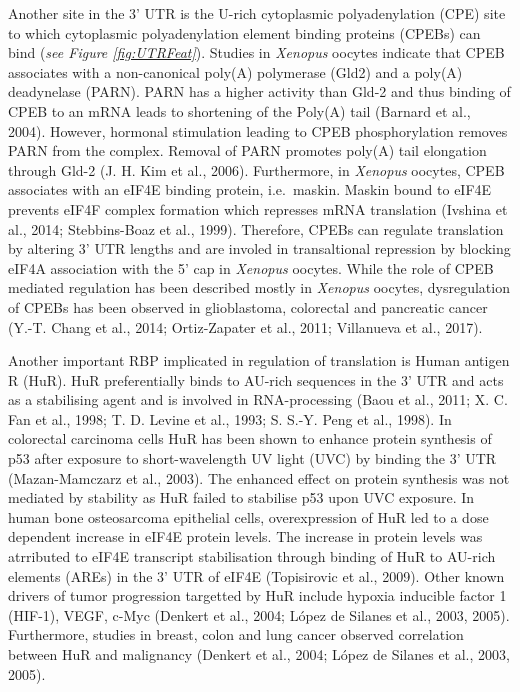 \documentclass[12pt,openany]{book}
\begin{document}
Another site in the 3' UTR is the U-rich cytoplasmic polyadenylation
(CPE) site to which cytoplasmic polyadenylation element binding proteins
(CPEBs) can bind (\emph{see Figure \ref{fig:UTRFeat}}). Studies in
\emph{Xenopus} oocytes indicate that CPEB associates with a
non-canonical poly(A) polymerase (Gld2) and a poly(A) deadynelase
(PARN). PARN has a higher activity than Gld-2 and thus binding of CPEB
to an mRNA leads to shortening of the Poly(A) tail (Barnard et al.,
2004). However, hormonal stimulation leading to CPEB phosphorylation
removes PARN from the complex. Removal of PARN promotes poly(A) tail
elongation through Gld-2 (J. H. Kim et al., 2006). Furthermore, in
\emph{Xenopus} oocytes, CPEB associates with an eIF4E binding protein,
i.e.~maskin. Maskin bound to eIF4E prevents eIF4F complex formation
which represses mRNA translation (Ivshina et al., 2014; Stebbins-Boaz et
al., 1999). Therefore, CPEBs can regulate translation by altering 3' UTR
lengths and are involed in transaltional repression by blocking eIF4A
association with the 5' cap in \emph{Xenopus} oocytes. While the role of
CPEB mediated regulation has been described mostly in \emph{Xenopus}
oocytes, dysregulation of CPEBs has been observed in glioblastoma,
colorectal and pancreatic cancer (Y.-T. Chang et al., 2014;
Ortiz-Zapater et al., 2011; Villanueva et al., 2017).

Another important RBP implicated in regulation of translation is Human
antigen R (HuR). HuR preferentially binds to AU-rich sequences in the 3'
UTR and acts as a stabilising agent and is involved in RNA-processing
(Baou et al., 2011; X. C. Fan et al., 1998; T. D. Levine et al., 1993;
S. S.-Y. Peng et al., 1998). In colorectal carcinoma cells HuR has been
shown to enhance protein synthesis of p53 after exposure to
short-wavelength UV light (UVC) by binding the 3' UTR (Mazan-Mamczarz et
al., 2003). The enhanced effect on protein synthesis was not mediated by
stability as HuR failed to stabilise p53 upon UVC exposure. In human
bone osteosarcoma epithelial cells, overexpression of HuR led to a dose
dependent increase in eIF4E protein levels. The increase in protein
levels was atrributed to eIF4E transcript stabilisation through binding
of HuR to AU-rich elements (AREs) in the 3' UTR of eIF4E (Topisirovic et
al., 2009). Other known drivers of tumor progression targetted by HuR
include hypoxia inducible factor 1 (HIF-1), VEGF, c-Myc (Denkert et al.,
2004; López de Silanes et al., 2003, 2005). Furthermore, studies in
breast, colon and lung cancer observed correlation between HuR and
malignancy (Denkert et al., 2004; López de Silanes et al., 2003, 2005).
\end{document}
